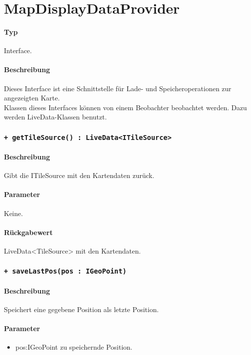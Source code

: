 \section{MapDisplayDataProvider}
\paragraph*{Typ}
Interface.
\paragraph*{Beschreibung}
Dieses Interface ist eine Schnittstelle für Lade- und Speicheroperationen zur angezeigten Karte.\\
Klassen dieses Interfaces können von einem Beobachter beobachtet werden. Dazu werden 
LiveData-Klassen benutzt.

\subsubsection{\texttt{+ getTileSource() : LiveData<ITileSource>}}%
\paragraph*{Beschreibung}
Gibt die ITileSource mit den Kartendaten zurück.
\paragraph*{Parameter}
Keine.
\paragraph*{Rückgabewert}
LiveData<TileSource> mit den Kartendaten.

\subsubsection{\texttt{+ saveLastPos(pos : IGeoPoint)}}%
\paragraph*{Beschreibung}
Speichert eine gegebene Position als letzte Position.
\paragraph*{Parameter}
\begin{itemize}
    \item pos:IGeoPoint zu speichernde Position.
\end{itemize}
